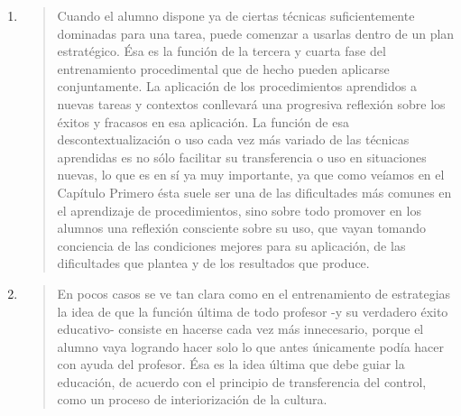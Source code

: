 \documentclass{article}
\begin{document}
\begin{enumerate}
  \item \begin{quote}
  Cuando el alumno dispone ya de ciertas técnicas suficientemente dominadas para una tarea, puede comenzar a usarlas dentro de un plan estratégico. Ésa es la función de la tercera y cuarta fase del entrenamiento procedimental que de hecho pueden aplicarse conjuntamente. La aplicación de los procedimientos aprendidos a nuevas tareas y contextos conllevará una progresiva reflexión sobre los éxitos y fracasos en esa aplicación. La función de esa descontextualización o uso cada vez más variado de las técnicas aprendidas es no sólo facilitar su transferencia o uso en situaciones nuevas, lo que es en sí ya muy importante, ya que como veíamos en el Capítulo Primero ésta suele ser una de las dificultades más comunes en el aprendizaje de procedimientos, sino sobre todo promover en los alumnos una reflexión consciente sobre su uso, que vayan tomando conciencia de las condiciones mejores para su aplicación, de las dificultades que plantea y de los resultados que produce. 
  \end{quote}

  \item \begin{quote}
  En pocos casos se ve tan clara como en el entrenamiento de estrategias la idea de que la función última de todo profesor -y su verdadero éxito educativo- consiste en hacerse cada vez más innecesario, porque el alumno vaya logrando hacer solo lo que antes únicamente podía hacer con ayuda del profesor. Ésa es la idea última que debe guiar la educación, de acuerdo con el principio de transferencia del control, como un proceso de interiorización de la cultura.  
  \end{quote}
\end{enumerate}



 
\end{document}
